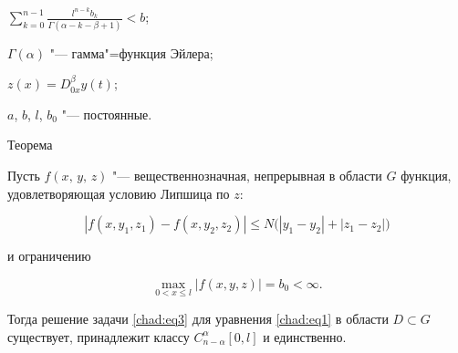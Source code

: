 $

\sum_{k=0}^{n-1} \frac{l^{n-k}b_k}{\Gamma (\alpha -k-\beta +1)}<b$;

$\Gamma(\alpha)$ "--- гамма"=функция Эйлера;

$z(x)=D_{0x}^\beta y(t)$;

$a$,  $b$,  $l$,  $b_0$ "--- постоянные.





\begin{newthm}{Теорема} 

Пусть $f(x, \, y, \, z)$ "--- вещественнозначная,  непрерывная в области $G$ функция,  удовлетворяющая условию Липшица по $z{:}$

\begin{equation}

\label{chad:eq5}

|f(x, y_1, z_1)-f(x, y_2, z_2)|\leq N \bigl(|y_1-y_2|+|z_1-z_2|\bigr)

\end{equation}

и ограничению

\begin{equation}

\label{chad:eq6}

\max_{0<x\leq l}|f(x, y, z)|=b_0<\infty.

\end{equation}                                    

Тогда решение задачи  \eqref{chad:eq3} для уравнения \eqref{chad:eq1} в области $D\subset G$ существует,  принадлежит классу $C_{n-\alpha}^\alpha[0, l]$ и единственно.

\end{newthm}



